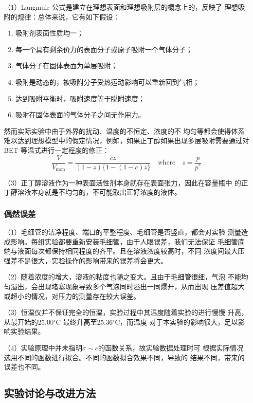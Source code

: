 \documentclass[12pt]{ctexart}
\numberwithin{equation}{section}
\begin{document}
（1）Langmuir 公式是建立在理想表面和理想吸附层的概念上的，反映了
理想吸附的规律：总体来说，它有如下假设：

\begin{enumerate}
    \item 吸附剂表面性质均一；
    \item 每一个具有剩余价力的表面分子或原子吸附一个气体分子；
    \item 气体分子在固体表面为单层吸附；
    \item 吸附是动态的，被吸附分子受热运动影响可以重新回到气相；
    \item 达到吸附平衡时，吸附速度等于脱附速度；
    \item 吸附在固体表面的气体分子之间无作用力。
\end{enumerate}

然而实际实验中由于外界的扰动、温度的不恒定、浓度的不
均匀等都会使得体系难以达到理想模型中的假定情况，例如，如果正丁醇如果出现多层吸附需要通过对 BET 等温式进行一定程度的修正：
\[
    \frac{V}{V_{\text{mon}}} = \frac{cz}{(1-z)\{1-(1-c)z\}} \quad\text{where} \quad z = \frac{p}{p^*} 
\]

（3）正丁醇溶液作为一种表面活性剂本身就存在表面张力，因此在容量瓶中
的正丁醇溶液本身就是不均匀的，不可能取出正好浓度的液体。

\subsubsection{偶然误差}

（1）毛细管的洁净程度、端口的平整程度、毛细管是否竖直，都会对实验
测量造成影响。每组实验都要重新安装毛细管，由于人眼误差，我们无法保证
毛细管底端与液面每次都保持相同程度的齐平。且在溶液浓度较高时，不同
浓度间最大压强差不是很大，实验操作的影响带来的误差将会更大。

（2）随着浓度的增大，溶液的粘度也随之变大。且由于毛细管很细，气泡
不能均匀溢出，会出现堵塞现象导致多个气泡同时溢出一同爆开，从而出现
压差值超大或超小的情况，对压力的测量存在较大误差。

（3）恒温仪并不保证完全的恒温，实验过程中其温度随着实验的进行慢慢
升高，从最开始的25.00$^\circ$C 最终升高至25.36$^\circ$C，而温度
对于本实验的影响很大，足以影响实验结果。

（4）实验原理中并未指明$\sigma\sim c$的函数关系，故实验数据处理时可
根据实际情况选用不同的函数进行拟合。不同的函数拟合效果不同，导致的
结果不同，带来的误差也不同。

\subsection{实验讨论与改进方法}
\end{document}
